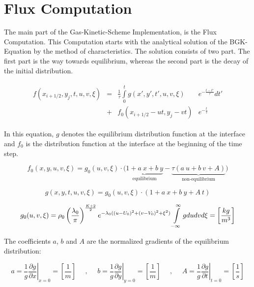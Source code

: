\documentclass[
	pdftex,             %
	12pt,				%
	a4paper,		   	%
	english,				%
	oneside,			%
]{article}
\begin{document}
\section{Flux Computation}

The main part of the Gas-Kinetic-Scheme Implementation, is the Flux Computation. This Computation starts with the analytical solution of the BGK-Equation by the method of characteristics. The solution consists of two part. The first part is the way towards equilibrium, whereas the second part is the decay of the initial distribution. 

\begin{equation}
\begin{split}
\begin{array}{lcll}
f(x_{i+1/2}, y_j, t,u,v,\xi) 
&=&
 \frac{1}{\tau} \int \limits_0^t
g(x', y', t', u, v, \xi) &e^{-\tfrac{t-t'}{\tau}} dt'
\\
&+& f_0(x_{i+1/2} - ut, y_j - vt) &e^{-\tfrac{t}{\tau}}
\end{array}
\end{split}
\end{equation}

In this equation, $g$ denotes the equilibrium distribution function at the interface and $f_0$ is the distribution function at the interface at the beginning of the time step. 

\begin{equation}
f_0(x,y,u,v,\xi) = g_0(u,v,\xi) \cdot
\Big( 
\underbrace{ 1 + a~x + b~y }_{\text{equilibrium}}
-
\underbrace{ \tau \left( a~u + b~v + A \right) }_{\text{non-equilibrium}}
\Big)
\end{equation}

\begin{equation}
g(x,y,t,u,v,\xi) = g_0(u,v,\xi) \cdot \left( 1 + a~x + b~y + A~t \right)
\end{equation}

\begin{equation}
g_0(u,v,\xi) = \rho_0 \left( \frac{\lambda_0}{\pi} \right)^{\frac{K+2}{2}}
           e^{-\lambda_0 ((u-U_0)^2 + (v-V_0)^2 + \xi^2)}
\hfill
\int \limits_{-\infty}^{\infty} g dudvd\xi = \left[ \dfrac{kg}{m^3} \right]
\end{equation}

The coefficients $a$, $b$ and $A$ are the normalized gradients of the equilibrium distribution:

\begin{equation}
a = \left. \frac{1}{g} \frac{\partial g}{\partial x} \right|_{x=0}
= \left[ \dfrac{1}{m} \right]
~~~~~~,~~~~~~
b = \left. \frac{1}{g} \frac{\partial g}{\partial y} \right|_{y=0}
= \left[ \dfrac{1}{m} \right] 
~~~~~~,~~~~~~
A = \left. \frac{1}{g} \frac{\partial g}{\partial t} \right|_{t=0}
= \left[ \dfrac{1}{s} \right]
\end{equation}
\end{document}
